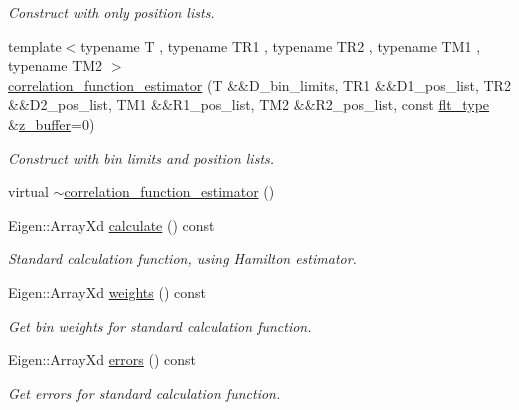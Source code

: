 \begin{DoxyCompactItemize}
\begin{DoxyCompactList}\small\item\em Construct with only position lists. \end{DoxyCompactList}\item 
{\footnotesize template$<$typename T , typename T\+R1 , typename T\+R2 , typename T\+M1 , typename T\+M2 $>$ }\\\hyperlink{classIceBRG_1_1correlation__function__estimator_a59237c5a746877067a4369b78e6f8ae9}{correlation\+\_\+function\+\_\+estimator} (T \&\&D\+\_\+bin\+\_\+limits, T\+R1 \&\&D1\+\_\+pos\+\_\+list, T\+R2 \&\&D2\+\_\+pos\+\_\+list, T\+M1 \&\&R1\+\_\+pos\+\_\+list, T\+M2 \&\&R2\+\_\+pos\+\_\+list, const \hyperlink{lib_2IceBRG__main_2common_8h_ad0f130a56eeb944d9ef2692ee881ecc4}{flt\+\_\+type} \&\hyperlink{magic__values_8hpp_a424f49a8036e9de5962c718fb785356f}{z\+\_\+buffer}=0)
\begin{DoxyCompactList}\small\item\em Construct with bin limits and position lists. \end{DoxyCompactList}\item 
virtual \hyperlink{classIceBRG_1_1correlation__function__estimator_a42ac5dffcb70b053754013d239e74a35}{$\sim$correlation\+\_\+function\+\_\+estimator} ()
\item 
Eigen\+::\+Array\+Xd \hyperlink{classIceBRG_1_1correlation__function__estimator_af8bf6a9491ce8f79794217aa184e6ca2}{calculate} () const 
\begin{DoxyCompactList}\small\item\em Standard calculation function, using Hamilton estimator. \end{DoxyCompactList}\item 
Eigen\+::\+Array\+Xd \hyperlink{classIceBRG_1_1correlation__function__estimator_a7ade911a81bda90e1d4b22f948dc3334}{weights} () const 
\begin{DoxyCompactList}\small\item\em Get bin weights for standard calculation function. \end{DoxyCompactList}\item 
Eigen\+::\+Array\+Xd \hyperlink{classIceBRG_1_1correlation__function__estimator_a069ffe500eed94e05d5900b75ac5ac9c}{errors} () const 
\begin{DoxyCompactList}\small\item\em Get errors for standard calculation function. \end{DoxyCompactList}\item 

\end{DoxyCompactItemize}
